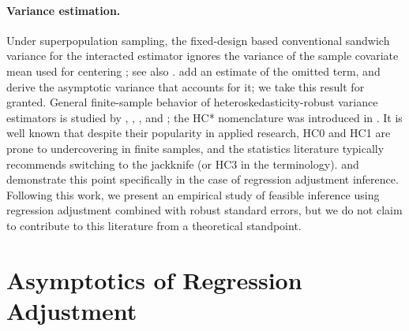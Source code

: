 \documentclass{article}
\theoremstyle{plain}
\theoremstyle{definition}
\theoremstyle{remark}
\begin{document}
\paragraph{Variance estimation.}
Under superpopulation sampling, the fixed-design based conventional sandwich variance for the interacted estimator ignores the variance of the sample covariate mean used for centering \citep[Section~5.3]{imbens2009recent}; see also \citet[Section~5]{Lin2013}. \citet{imbens2009recent} add an estimate of the omitted term, and \citet{negi2021revisiting} derive the asymptotic variance that accounts for it; we take this result for granted. General finite-sample behavior of heteroskedasticity-robust variance estimators is studied by \citet{EfronStein1981}, \citet{MacKinnonWhite1985}, \citet{ChesherJewitt1987}, \citet{LongErvin2000} and \citet{imbens2016robust}; the HC* nomenclature was introduced in \citet{MacKinnonWhite1985}. It is well known that despite their popularity in applied research, HC0 and HC1 are prone to undercovering in finite samples, and the statistics literature typically recommends switching to the jackknife (or HC3 in the \citet{MacKinnonWhite1985} terminology). \citet{lei2021regression} and \citet{ChiangMatsushitaOtsu2026} demonstrate this point specifically in the case of regression adjustment inference. Following this work, we present an empirical study of feasible inference using regression adjustment combined with robust standard errors, but we do not claim to contribute to this literature from a theoretical standpoint.

\section{Asymptotics of Regression Adjustment}
\label{sec:asymptotics}
\end{document}
